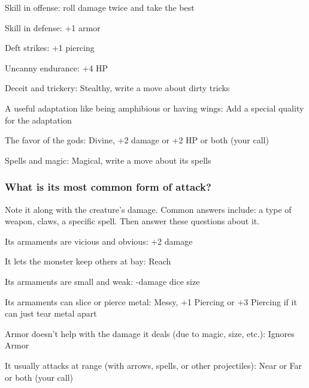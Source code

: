  
\item Skill in offense: roll damage twice and take the best

 
\item Skill in defense: +1 armor

 
\item Deft strikes: +1 piercing

 
\item Uncanny endurance: +4 HP

 
\item Deceit and trickery: Stealthy, write a move about dirty tricks

 
\item A useful adaptation like being amphibious or having wings: Add a special quality for the adaptation

 
\item The favor of the gods: Divine, +2 damage or +2 HP or both (your call)

 
\item Spells and magic: Magical, write a move about its spells


\stopitemize
 
\subsubsection{What is its most common form of attack?}     
 

Note it along with the creature's damage. Common answers include: a type of weapon, claws, a specific spell. Then answer these questions about it.

 
\startitemize[1,packed]

\item Its armaments are vicious and obvious: +2 damage

 
\item It lets the monster keep others at bay: Reach

 
\item Its armaments are small and weak: -damage dice size

 
\item Its armaments can slice or pierce metal: Messy, +1 Piercing or +3 Piercing if it can just tear metal apart

 
\item Armor doesn't help with the damage it deals (due to magic, size, etc.): Ignores Armor

 
\item It usually attacks at range (with arrows, spells, or other projectiles): Near or Far or both (your call)


